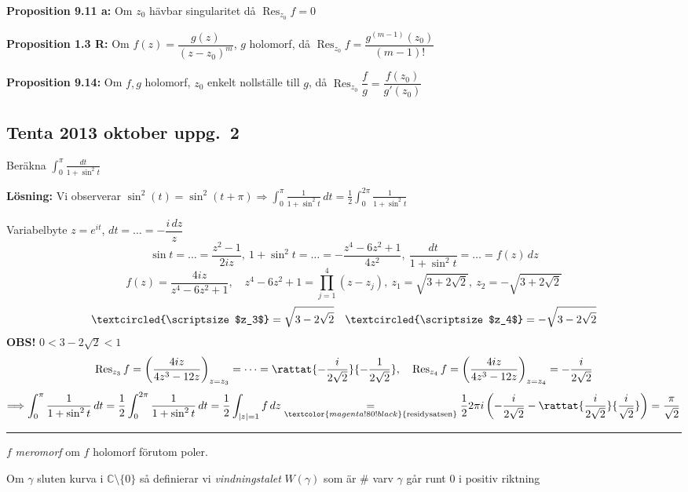 \textbf{Proposition 9.11 a:} Om $z_0$ hävbar singularitet då $\operatorname{Res}_{z_0} f = 0$

\textbf{Proposition 1.3 R:} Om $f(z) = \dfrac{g(z)}{(z - z_0)^m}$, $g$ holomorf, då $\operatorname{Res}_{z_0} f = \dfrac{g^{(m-1)}(z_0)}{(m - 1)!}$

\textbf{Proposition 9.14:} Om $f, g$ holomorf, $z_0$ enkelt nollställe till $g$, då $\operatorname{Res}_{z_0} \dfrac{f}{g} = \dfrac{f(z_0)}{g'(z_0)}$

\subsection{Tenta 2013 oktober uppg.\ 2}
Beräkna $\displaystyle\int_0^\pi \frac{dt}{1 + \sin^2 t}$

\textbf{Lösning:} Vi observerar $\sin^2(t) = \sin^2(t + \pi) \Rightarrow \displaystyle\int_0^\pi \frac{1}{1 + \sin^2 t}\,dt = \frac{1}{2} \int_0^{2\pi} \frac{1}{1 + \sin^2 t}$

Variabelbyte $z = e^{it}$, $dt = \dots = -\dfrac{i\,dz}{z}$
\[ \sin t = \dots = \frac{z^2 - 1}{2iz},\ 1 + \sin^2 t = \dots = -\frac{z^4 - 6z^2 + 1}{4z^2},\ \frac{dt}{1 + \sin^2 t} = \dots = f(z)\,dz \]
\[ f(z) = \frac{4iz}{z^4 - 6z^2 + 1}, \quad z^4 - 6z^2 + 1 = \prod_{j = 1}^4 (z - z_j),\ z_1 = \sqrt{3 + 2\sqrt{2}},\ z_2 = -\sqrt{3 + 2\sqrt{2}} \]
\[ \textcircled{\scriptsize $z_3$} = \sqrt{3 - 2\sqrt{2}} \quad \textcircled{\scriptsize $z_4$} = -\sqrt{3 - 2\sqrt{2}} \]
\textcolor{red!70!black}{\textbf{OBS!}} $0 < 3 - 2\sqrt{2} < 1$
\[ \operatorname{Res}_{z_3} f = \left( \frac{4iz}{4z^3 - 12z} \right)_{z = z_3} = \dots = \rattat{-\frac{i}{2\sqrt{2}}}{-\frac{1}{2\sqrt{2}}}, \quad \operatorname{Res}_{z_4} f = \left( \frac{4iz}{4z^3 - 12z} \right)_{z = z_4} = -\frac{i}{2\sqrt{2}} \]
\[ \Longrightarrow \int_0^\pi \frac{1}{1 + \sin^2 t}\,dt = \frac{1}{2} \int_0^{2\pi} \frac{1}{1 + \sin^2 t}\,dt = \frac{1}{2} \int_{|z| = 1} f\,dz \underset{\textcolor{magenta!80!black}{\text{residysatsen}}}{=} \frac{1}{2} 2\pi i\left( -\frac{i}{2\sqrt{2}} - \rattat{\frac{i}{2\sqrt{2}}}{\frac{i}{\sqrt{2}}} \right) = \frac{\pi}{\sqrt{2}} \]

\noindent\rule{\linewidth}{0.4pt}

\begin{definition}
$f$ \emph{meromorf} om $f$ holomorf förutom poler.
\end{definition}
\begin{definition}
Om $\gamma$ sluten kurva i $\mathbb{C} \setminus \{0\}$ så definierar vi \emph{vindningstalet} $W(\gamma)$ som är \# varv $\gamma$ går runt $0$ i positiv riktning
\end{definition}

